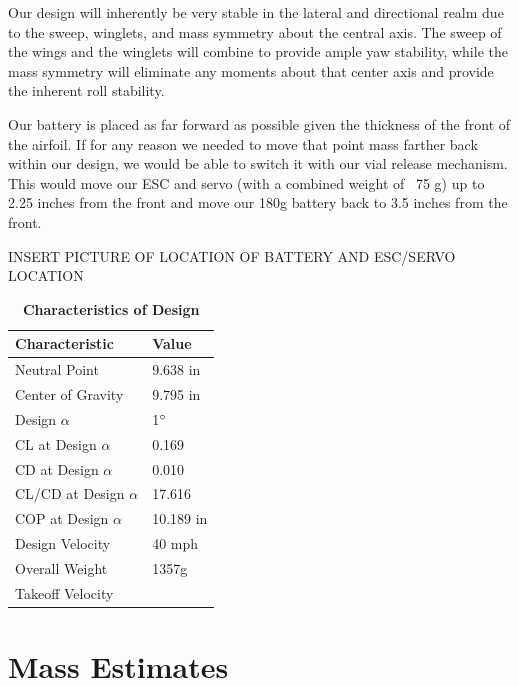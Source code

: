 Our design will inherently be very stable in the lateral and directional realm due to the sweep, winglets, and mass symmetry about the central axis. The sweep of the wings and the winglets will combine to provide ample yaw stability, while the mass symmetry will eliminate any moments about that center axis and provide the inherent roll stability.

Our battery is placed as far forward as possible given the thickness of the front of the airfoil. If for any reason we needed to move that point mass farther back within our design, we would be able to switch it with our vial release mechanism. This would move our ESC and servo (with a combined weight of ~75 g) up to 2.25 inches from the front and move our 180g battery back to 3.5 inches from the front. 

INSERT PICTURE OF LOCATION OF BATTERY AND ESC/SERVO LOCATION

\begin{table}[H]
        \begin{center}
        \caption{\textbf{Characteristics of Design}} \label{table:Weights}
        \begin{tabular}{|p{1.4in}|p{1in}|} %
        \hline
            \textbf{Characteristic} & \textbf{Value} \\ \hline
            Neutral Point & 9.638 in \\ \hline
            Center of Gravity & 9.795 in \\ \hline
            Design $\alpha$ & 1$\degree$ \\ \hline
            CL at Design $\alpha$ & 0.169 \\ \hline
            CD at Design $\alpha$ & 0.010 \\ \hline
            CL/CD at Design $\alpha$ & 17.616 \\ \hline
            COP at Design $\alpha$ & 10.189 in \\ \hline
            Design Velocity & 40 mph \\ \hline
            Overall Weight & 1357g \\ \hline
            Takeoff Velocity & 
        \end{tabular}
        \end{center}
    \end{table}


\section{Mass Estimates}

